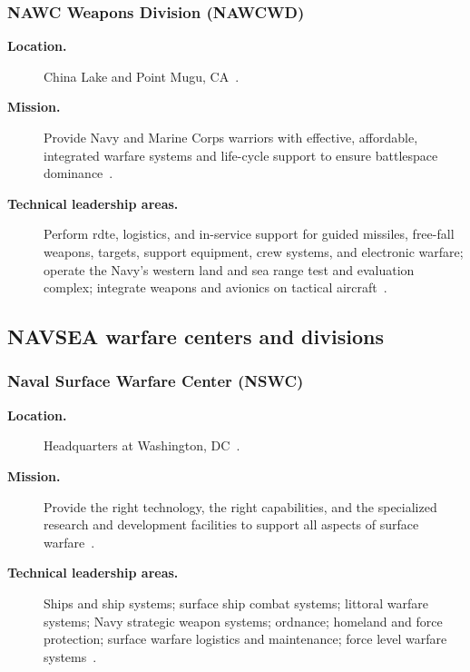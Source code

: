 \documentclass[../main.tex]{subfiles}
\begin{document}
\subsubsection{NAWC Weapons Division (NAWCWD)}
\begin{description}
  \item[\textbf{Location.}] China Lake and Point Mugu, CA~\autocite{edo-2-1-4-warfare-centers-2024}.
  \item[\textbf{Mission.}] Provide Navy and Marine Corps warriors with effective, affordable, integrated warfare systems and life-cycle support to ensure battlespace dominance~\autocite{edo-2-1-4-warfare-centers-2024}.
  \item[\textbf{Technical leadership areas.}] Perform \ac{rdte}, logistics, and in-service support for guided missiles, free-fall weapons, targets, support equipment, crew systems, and electronic warfare; operate the Navy's western land and sea range test and evaluation complex; integrate weapons and avionics on tactical aircraft~\autocite{edo-2-1-4-warfare-centers-2024}.
\end{description}

\subsection{NAVSEA warfare centers and divisions}
\subsubsection{Naval Surface Warfare Center (NSWC)}
\begin{description}
  \item[\textbf{Location.}] Headquarters at Washington, DC~\autocite{edo-2-1-4-warfare-centers-2024}.
  \item[\textbf{Mission.}] Provide the right technology, the right capabilities, and the specialized research and development facilities to support all aspects of surface warfare~\autocite{edo-2-1-4-warfare-centers-2024}.
  \item[\textbf{Technical leadership areas.}] Ships and ship systems; surface ship combat systems; littoral warfare systems; Navy strategic weapon systems; ordnance; homeland and force protection; surface warfare logistics and maintenance; force level warfare systems~\autocite{edo-2-1-4-warfare-centers-2024}.
\end{description}
\end{document}
